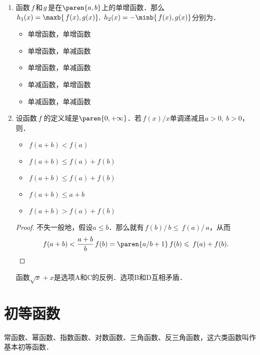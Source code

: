 \begin{enumerate}
\item 函数\(\,f\,\)和\(\mkern2mu g\mkern1mu\)是在\(\paren{a,b}\)上的单增函数．那么\(h_1(x) = \maxb{\,f(x), g(x)},\ h_2(x) = -\minb{\,f(x), g(x)}\)分别为\uline{\makebox[6em]{}}．
  \begin{itemize}
    \renewcommand{\labelitemi}{\faCircleThin}
  \item 单增函数，单增函数
    \ifshowsol
    \item[\faCircle] 单增函数，单减函数
    \else
    \item 单增函数，单减函数
    \fi
  \item 单减函数，单增函数
  \item 单减函数，单减函数
  \end{itemize}

\item 设函数\(\,f\mkern2mu\)的定义域是\(\paren{0,+\infty}\)．若\(\,f(x)/x\)单调递减且\(a > 0,\ b > 0\)，则\uline{\makebox[6em]{}}．
  \begin{itemize}
    \renewcommand{\labelitemi}{\faCircleThin}
  \item \(\,f(a+b) < f(a)\)
    \ifshowsol
    \item[\faCircle] \(\,f(a+b) \le f(a) + f(b)\)
    \else
    \item \(\,f(a+b) \le f(a) + f(b)\)
    \fi
  \item \(\,f(a+b) \le a + b\)
  \item \(\,f(a+b) > f(a) + f(b)\)
  \end{itemize}

  \ifshowsol
    \begin{proof}
      不失一般地，假设\(a \le b\)．那么就有\(\,f(b)/\,b \le \,f(a)/\,a\)，从而
      \begin{equation*}
        f(a+b)
        < \frac{a+b}{b} \,f(b) \\
        = \paren{a/b + 1} \,f(b) \\
        \le \,f(a) + f(b). \qedhere
      \end{equation*}
    \end{proof}
    函数\(\sqrt x + x\)是选项A和C的反例．选项B和D互相矛盾．
  \fi
\end{enumerate}
\fi

\section{初等函数}

\begin{definition*}
  常函数、幂函数、指数函数、对数函数、三角函数、反三角函数，这六类函数叫作基本初等函数．
\end{definition*}


